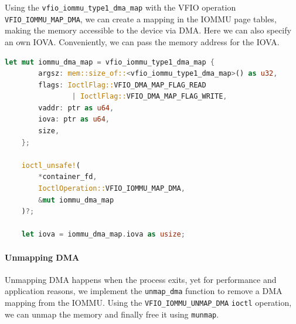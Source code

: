 Using the \texttt{vfio\_iommu\_type1\_dma\_map} with the VFIO operation \texttt{VFIO\_IOMMU\_MAP\_DMA}, we can create a mapping in the IOMMU page tables, making the memory accessible to the device via DMA. Here we can also specify an own IOVA. Conveniently, we can pass the memory address for the IOVA.


\begin{lstlisting}[language=Rust,caption={Mapping memory for DMA}, label=lst:mapdma]
    let mut iommu_dma_map = vfio_iommu_type1_dma_map {
        argsz: mem::size_of::<vfio_iommu_type1_dma_map>() as u32,
        flags: IoctlFlag::VFIO_DMA_MAP_FLAG_READ 
                | IoctlFlag::VFIO_DMA_MAP_FLAG_WRITE,
        vaddr: ptr as u64,
        iova: ptr as u64,
        size,
    };

    ioctl_unsafe!(
        *container_fd,
        IoctlOperation::VFIO_IOMMU_MAP_DMA,
        &mut iommu_dma_map
    )?;

    let iova = iommu_dma_map.iova as usize; 
\end{lstlisting}

\paragraph{Unmapping DMA}
Unmapping DMA happens when the process exits, yet for performance and application reasons, we implement the \texttt{unmap\_dma} function to remove a DMA mapping from the IOMMU. Using the \texttt{VFIO\_IOMMU\_UNMAP\_DMA} \texttt{ioctl} operation, we can unmap the memory and finally free it using \texttt{munmap}.

\newpage

